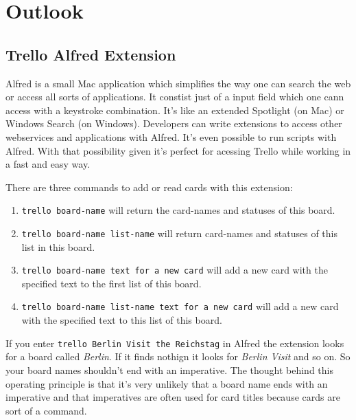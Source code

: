 
\chapter{Outlook}
  \label{Outlook}

\section{Trello Alfred Extension}

Alfred \cite{alfred} is a small Mac application which simplifies the way one can search the web or access all sorts of applications. It constist just of a input field which one cann access with a keystroke combination. It's like an extended Spotlight (on Mac) or Windows Search (on Windows). Developers can write extensions to access other webservices and applications with Alfred. It's even possible to run scripts with Alfred. With that possibility given it's perfect for acessing Trello while working in a fast and easy way. 



There are three commands to add or read cards with this extension:

\begin{enumerate}
	\item \texttt{trello board-name} will return the card-names and statuses of this board.
	\item \texttt{trello board-name list-name} will return card-names and statuses of this list in this board.
	\item \texttt{trello board-name text for a new card} will add a new card with the specified text to the first list of this board.
	\item \texttt{trello board-name list-name text for a new card} will add a new card with the specified text to this list of this board.
\end{enumerate}

If you enter \texttt{trello Berlin Visit the Reichstag} in Alfred the extension looks for a board called \emph{Berlin}. If it finds nothign it looks for \emph{Berlin Visit} and so on. So your board names shouldn't end with an imperative. The thought behind this operating principle is that it's very unlikely that a board name ends with an imperative and that imperatives are often used for card titles because cards are sort of a command.

